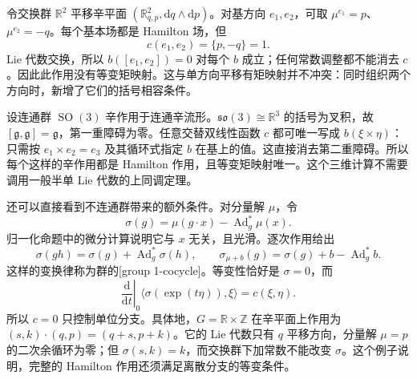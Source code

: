 \begin{example}\label{g4:exm:1001:translation-cocycle}
	令交换群 \(\mathbb R^2\) 平移辛平面 \((\mathbb R^2_{q,p},\mathrm{d}q\wedge\mathrm{d}p)\)。对基方向 \(e_1,e_2\)，可取 \(\mu^{e_1}=p\)、\(\mu^{e_2}=-q\)。每个基本场都是 Hamilton 场，但
	\[
		c(e_1,e_2)=\{p,-q\}=1.
	\]
	Lie 代数交换，所以 \(b([e_1,e_2])=0\) 对每个 \(b\) 成立；任何常数调整都不能消去 \(c\)。因此此作用没有等变矩映射。这与单方向平移有矩映射并不冲突：同时组织两个方向时，新增了它们的括号相容条件。
\end{example}

\begin{example}\label{g4:exm:1001:so3-existence}
	设连通群 \(\operatorname{SO}(3)\) 辛作用于连通辛流形。\(\mathfrak{so}(3)\cong\mathbb R^3\) 的括号为叉积，故 \([\mathfrak g,\mathfrak g]=\mathfrak g\)，第一重障碍为零。任意交替双线性函数 \(c\) 都可唯一写成 \(b(\xi\times\eta)\)：只需按 \(e_1\times e_2=e_3\) 及其循环式指定 \(b\) 在基上的值。这直接消去第二重障碍。所以每个这样的辛作用都是 Hamilton 作用，且等变矩映射唯一。这个三维计算不需要调用一般半单 Lie 代数的上同调定理。
\end{example}

还可以直接看到不连通群带来的额外条件。对分量解 \(\mu\)，令
\[
	\sigma(g)=\mu(g\cdot x)-\operatorname{Ad}_g^*\mu(x).
\]
归一化命题中的微分计算说明它与 \(x\) 无关，且光滑。逐次作用给出
\begin{equation}\label{g4:eq:1001:group-cocycle}
	\sigma(gh)=\sigma(g)+\operatorname{Ad}_g^*\sigma(h),\qquad
	\sigma_{\mu+b}(g)=\sigma(g)+b-\operatorname{Ad}_g^*b.
\end{equation}
这样的变换律称为群的[group 1-cocycle]。等变性恰好是 \(\sigma=0\)，而
\[
	\left.\frac{\mathrm{d}}{\mathrm{d}t}\right|_{0}
	\langle\sigma(\exp(t\eta)),\xi\rangle=c(\xi,\eta).
\]
所以 \(c=0\) 只控制单位分支。具体地，\(G=\mathbb R\times\mathbb Z\) 在辛平面上作用为 \((s,k)\cdot(q,p)=(q+s,p+k)\)。它的 Lie 代数只有 \(q\) 平移方向，分量解 \(\mu=p\) 的二次余循环为零；但 \(\sigma(s,k)=k\)，而交换群下加常数不能改变 \(\sigma\)。这个例子说明，完整的 Hamilton 作用还须满足离散分支的等变条件。
